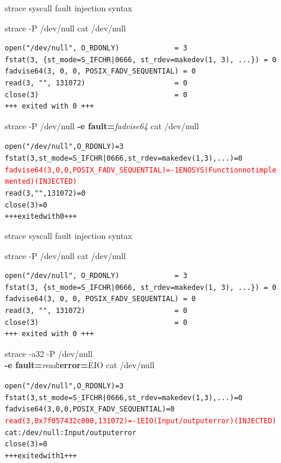 \documentclass[unicode]{beamer}
\begin{document}
\begin{frame}[fragile]{strace syscall fault injection syntax}
\scriptsize
\begin{block}{\large strace -P /dev/null cat /dev/null}
\begin{verbatim}
open("/dev/null", O_RDONLY)             = 3
fstat(3, {st_mode=S_IFCHR|0666, st_rdev=makedev(1, 3), ...}) = 0
fadvise64(3, 0, 0, POSIX_FADV_SEQUENTIAL) = 0
read(3, "", 131072)                     = 0
close(3)                                = 0
+++ exited with 0 +++
\end{verbatim}
\end{block}
\begin{block}{\large strace -P /dev/null {\bf -e fault=}{\it fadvise64} cat /dev/null}
\begin{alltt}
open("/dev/null", O_RDONLY)             = 3
fstat(3, {st_mode=S_IFCHR|0666, st_rdev=makedev(1, 3), ...}) = 0
\textcolor{red}{fadvise64(3, 0, 0, POSIX_FADV_SEQUENTIAL) = -1 ENOSYS (Function not imple
mented) (INJECTED)}
read(3, "", 131072)                     = 0
close(3)                                = 0
+++ exited with 0 +++
\end{alltt}
\end{block}
\end{frame}

\begin{frame}[fragile]{strace syscall fault injection syntax}
\scriptsize
\begin{block}{\large strace -P /dev/null cat /dev/null}
\begin{verbatim}
open("/dev/null", O_RDONLY)             = 3
fstat(3, {st_mode=S_IFCHR|0666, st_rdev=makedev(1, 3), ...}) = 0
fadvise64(3, 0, 0, POSIX_FADV_SEQUENTIAL) = 0
read(3, "", 131072)                     = 0
close(3)                                = 0
+++ exited with 0 +++
\end{verbatim}
\end{block}
\begin{block}{\large strace -a32 -P /dev/null \\ {\bf -e fault=}{\it read}{\bf :error=}{\sc EIO} cat /dev/null}
\begin{alltt}
open("/dev/null", O_RDONLY)             = 3
fstat(3, {st_mode=S_IFCHR|0666, st_rdev=makedev(1, 3), ...}) = 0
fadvise64(3, 0, 0, POSIX_FADV_SEQUENTIAL) = 0
\textcolor{red}{read(3, 0x7f057432c000, 131072) = -1 EIO (Input/output error) (INJECTED)}
cat: /dev/null: Input/output error
close(3)                                = 0
+++ exited with 1 +++
\end{alltt}
\end{block}
\end{frame}
\end{document}
